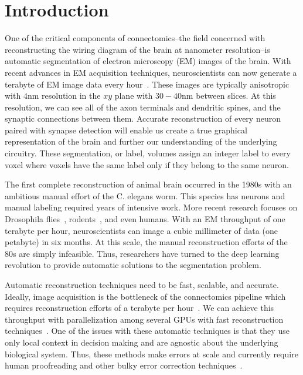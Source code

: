 \section{Introduction}

One of the critical components of connectomics--the field concerned with reconstructing the wiring diagram of the brain at nanometer resolution--is automatic segmentation of electron microscopy (EM) images of the brain.
With recent advances in EM acquisition techniques, neuroscientists can now generate a terabyte of EM image data every hour~\cite{richard2016imaging}.
These images are typically anisotropic with $4$nm resolution in the $xy$ plane with $30-40$nm between slices. 
At this resolution, we can see all of the axon terminals and dendritic spines, and the synaptic connections between them.
Accurate reconstruction of every neuron paired with synapse detection will enable us create a true graphical representation of the brain and further our understanding of the underlying circuitry.
These segmentation, or label, volumes assign an integer label to every voxel where voxels have the same label only if they belong to the same neuron.

The first complete reconstruction of animal brain occurred in the 1980s with an ambitious manual effort of the C. elegans worm. 
This species has  neurons and manual labeling required  years of intensive work.
More recent research focuses on Drosophila flies~\cite{jovanic2016competitive}, rodents~\cite{richard2016imaging,suissa2016automatic}, and even humans. 
With an EM throughput of one terabyte per hour, neuroscientists can image a cubic millimeter of data (one petabyte) in six months. 
At this scale, the manual reconstruction efforts of the 80s are simply infeasible.
Thus, researchers have turned to the deep learning revolution to provide automatic solutions to the segmentation problem.

Automatic reconstruction techniques need to be fast, scalable, and accurate.
Ideally, image acquisition is the bottleneck of the connectomics pipeline which requires reconstruction efforts of a terabyte per hour~\cite{haehn2017scalable}.
We can achieve this throughput with parallelization among several GPUs with fast reconstruction techniques~\cite{funke2017deep,parag2017anisotropic}.
One of the issues with these automatic techniques is that they use only local context in decision making and are agnostic about the underlying biological system.
Thus, these methods make errors at scale and currently require human proofreading and other bulky error correction techniques~\cite{haehn2017guided,error_correction_using_CNN}. 

